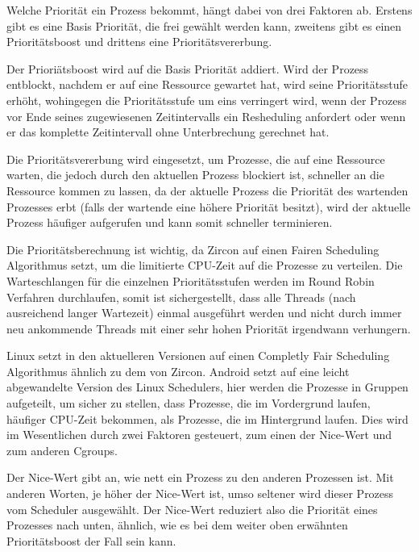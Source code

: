 \documentclass[a4paper]{scrartcl}
\begin{document}
Welche Priorität ein Prozess bekommt, hängt dabei von drei Faktoren ab. Erstens gibt es eine Basis Priorität, die frei gewählt werden kann, zweitens gibt es einen Prioritätsboost und drittens eine Prioritätsvererbung.

Der Prioriätsboost wird auf die Basis Priorität addiert. Wird der Prozess entblockt, nachdem er auf eine Ressource gewartet hat, wird seine Prioritätsstufe erhöht, wohingegen die Prioritätsstufe um eins verringert wird, wenn der Prozess vor Ende seines zugewiesenen Zeitintervalls ein Resheduling anfordert oder wenn er das komplette Zeitintervall ohne Unterbrechung gerechnet hat. \cite{Fuchsia.Zircon.Scheduling}

Die Prioritätsvererbung wird eingesetzt, um Prozesse, die auf eine Ressource warten, die jedoch durch den aktuellen Prozess blockiert ist, schneller an die Ressource kommen zu lassen, da der aktuelle Prozess die Priorität des wartenden Prozesses erbt (falls der wartende eine höhere Priorität besitzt), wird der aktuelle Prozess häufiger aufgerufen und kann somit schneller terminieren. \cite{Fuchsia.Zircon.Scheduling}

Die Prioritätsberechnung ist wichtig, da Zircon auf einen Fairen Scheduling Algorithmus setzt, um die limitierte CPU-Zeit auf die Prozesse zu verteilen. Die Warteschlangen für die einzelnen Prioritätsstufen werden im Round Robin Verfahren durchlaufen, somit ist sichergestellt, dass alle Threads (nach ausreichend langer Wartezeit) einmal ausgeführt werden und nicht durch immer neu ankommende Threads mit einer sehr hohen Priorität irgendwann verhungern. \cite{Fuchsia.Zircon.FairScheduler}

Linux setzt in den aktuelleren Versionen auf einen Completly Fair Scheduling Algorithmus ähnlich zu dem von Zircon. Android setzt auf eine leicht abgewandelte Version des Linux Schedulers, hier werden die Prozesse in Gruppen aufgeteilt, um sicher zu stellen, dass Prozesse, die im Vordergrund laufen, häufiger CPU-Zeit bekommen, als Prozesse, die im Hintergrund laufen. Dies wird im Wesentlichen durch zwei Faktoren gesteuert, zum einen der Nice-Wert und zum anderen Cgroups. \cite{Android.Process.Scheduler}

Der Nice-Wert gibt an, wie nett ein Prozess zu den anderen Prozessen ist. Mit anderen Worten, je höher der Nice-Wert ist, umso seltener wird dieser Prozess vom Scheduler ausgewählt. Der Nice-Wert reduziert also die Priorität eines Prozesses nach unten, ähnlich, wie es bei dem weiter oben erwähnten Prioritätsboost der Fall sein kann. \cite{Android.Process.Nice}
\end{document}
